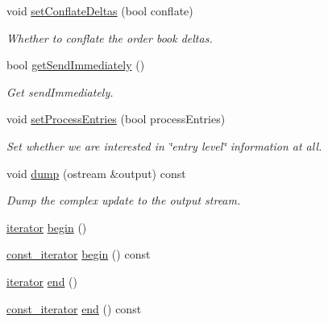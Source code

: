 \begin{CompactItemize}
void \hyperlink{classWombat_1_1MamdaOrderBookBasicDeltaList_80b385b03cc90b5e5ef8e49813988fae}{set\-Conflate\-Deltas} (bool conflate)
\begin{CompactList}\small\item\em Whether to conflate the order book deltas. \item\end{CompactList}\item 
bool \hyperlink{classWombat_1_1MamdaOrderBookBasicDeltaList_e05386ca5d3ac2d1931022a316baa2b5}{get\-Send\-Immediately} ()
\begin{CompactList}\small\item\em Get send\-Immediately. \item\end{CompactList}\item 
void \hyperlink{classWombat_1_1MamdaOrderBookBasicDeltaList_ffe27ce620459c70050d9aee60160dc7}{set\-Process\-Entries} (bool process\-Entries)
\begin{CompactList}\small\item\em Set whether we are interested in \char`\"{}entry level\char`\"{} information at all. \item\end{CompactList}\item 
void \hyperlink{classWombat_1_1MamdaOrderBookBasicDeltaList_ecec2f875f8ce26984e335842b6f26f0}{dump} (ostream \&output) const 
\begin{CompactList}\small\item\em Dump the complex update to the output stream. \item\end{CompactList}\item 
\hyperlink{classWombat_1_1MamdaOrderBookBasicDeltaList_1_1iterator}{iterator} \hyperlink{classWombat_1_1MamdaOrderBookBasicDeltaList_3f3f6c9249cde8c9505e07ad9fdfd915}{begin} ()
\item 
\hyperlink{classWombat_1_1MamdaOrderBookBasicDeltaList_1_1iterator}{const\_\-iterator} \hyperlink{classWombat_1_1MamdaOrderBookBasicDeltaList_2b566cb610ada343789d75df72031bb3}{begin} () const 
\item 
\hyperlink{classWombat_1_1MamdaOrderBookBasicDeltaList_1_1iterator}{iterator} \hyperlink{classWombat_1_1MamdaOrderBookBasicDeltaList_ea13d67de0766413616ddb6274e2bc18}{end} ()
\item 
\hyperlink{classWombat_1_1MamdaOrderBookBasicDeltaList_1_1iterator}{const\_\-iterator} \hyperlink{classWombat_1_1MamdaOrderBookBasicDeltaList_ec48ad2571651a3e6950851a41a42ff5}{end} () const 
\end{CompactItemize}
